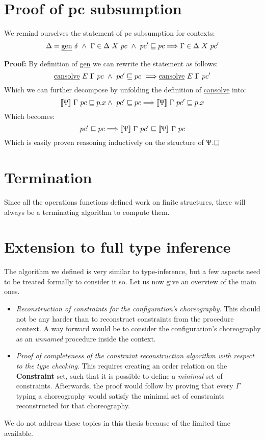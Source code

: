\documentclass[12pt,a4paper,twoside]{book}
\newcommand{\llbracket}{[\![}
\newcommand{\rrbracket}{]\!]}
\newcommand{\qed}{\hfill\square}
\begin{document}
\section{Proof of pc subsumption}
We remind ourselves the statement of pc subsumption for contexts:
$$
\Delta = \text{\underline{gen}}~\delta~\land~\Gamma\in\Delta ~X~pc~\land~pc' \sqsubseteq pc \Longrightarrow \Gamma \in \Delta~X~pc'
$$

\noindent\textbf{Proof:}
By definition of \underline{gen} we can rewrite the statement as follows:
$$
\text{\underline{cansolve}}~E~\Gamma~pc
~\land~pc'\sqsubseteq pc~\Longrightarrow
\text{\underline{cansolve}}~E~\Gamma~pc'
$$
Which we can further decompose by unfolding the definition of \underline{cansolve} into:
$$
\llbracket \Uppsi\rrbracket~\Gamma~pc\sqsubseteq p.x\land~pc'\sqsubseteq pc\Longrightarrow \llbracket \Uppsi\rrbracket~\Gamma~pc'\sqsubseteq p.x
$$
Which becomes:
$$
pc'\sqsubseteq pc\Longrightarrow \llbracket \Uppsi\rrbracket~\Gamma~pc'\sqsubseteq \llbracket\Uppsi\rrbracket~\Gamma~pc
$$
Which is easily proven reasoning inductively on the structure of $\Uppsi$.$\qed$

\section{Termination}
Since all the operations functions defined work on finite structures, there will always be a terminating algorithm to compute them.

\section{Extension to full type inference}
The algorithm we defined is very similar to type-inference\cite{pierce2002types}, but a few aspects need to be treated formally to consider it so. Let us now give an overview of the main ones.
\begin{itemize}
\item \emph{Reconstruction of constraints for the configuration's choreography}. This should not be any harder than to reconstruct constraints from the procedure context. A way forward would be to consider the configuration's choreography as an \emph{unnamed} procedure inside the context.
\item \emph{Proof of completeness of the constraint reconstruction algorithm with respect to the type checking}. This requires creating an order relation on the \textbf{Constraint} set, such that it is possible to define a \emph{minimal} set of constraints. Afterwards, the proof would follow by proving that every $\Gamma$ typing a choreography would satisfy the minimal set of constraints reconstructed for that choreography.
\end{itemize}
We do not address these topics in this thesis because of the limited time available.
\end{document}
